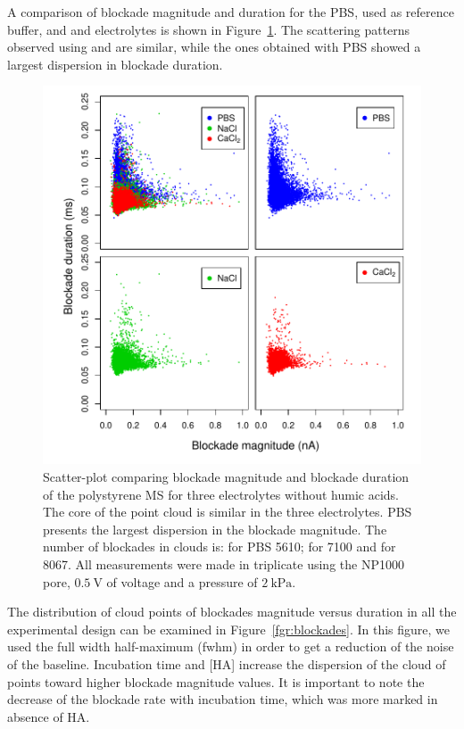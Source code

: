 \documentclass[journal=langd5,manuscript=article]{achemso}
\begin{document}
A comparison of blockade magnitude and duration for the PBS, used as reference  buffer, and  and  electrolytes is shown in Figure~\ref{fgr:pairs_buffers}.
The scattering patterns observed using    and  are similar, while the ones obtained with PBS showed a largest dispersion in blockade duration.
 \begin{figure}
  \includegraphics[width=\linewidth]{Figures/Raw_Pairs_buffers_MS_T0_Fwhm.pdf}
  \caption{Scatter-plot comparing  blockade magnitude and
  blockade duration of  the polystyrene MS for three
  electrolytes without humic acids. The core of the point cloud is similar in the three electrolytes. PBS  presents the largest dispersion in the blockade magnitude. The number of blockades in clouds is: for PBS 5610; for  7100 and for  8067. All measurements were made in triplicate using the NP1000 pore, $0.5~\mathrm{V}$ of voltage and a pressure of $2~\mathrm{kPa}$.} 
  \label{fgr:pairs_buffers}
\end{figure}






The  distribution of cloud points of blockades magnitude versus duration in all the experimental design can be examined in Figure~\ref{fgr:blockades}. In this figure, we used the full width half-maximum (fwhm) in order to get a reduction of the noise of the baseline. Incubation time and [HA]  increase the dispersion of the cloud of points toward higher blockade magnitude values. It is important to note the decrease of the blockade rate with incubation time, which was more marked in absence of HA.
\end{document}
